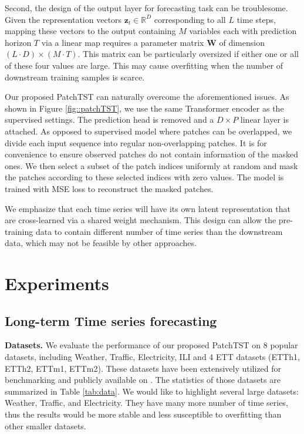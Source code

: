 \documentclass{article} \usepackage{iclr2023_conference,times}
\def\vz{{\bm{z}}}
\newcommand{\R}{\mathbb{R}}
\begin{document}
Second, the design of the output layer for forecasting task can be troublesome. Given the representation vectors  $\vz_t \in \R^D$ corresponding to all $L$ time steps, mapping these vectors to the output containing $M$ variables each with prediction horizon $T$ via a linear map requires a parameter matrix $\mathbf{W}$ of dimension $(L \cdot D) \times (M \cdot T)$. This matrix can be particularly oversized if either one or all of these four values are large. This may cause overfitting when the number of downstream training samples is scarce. 

Our proposed PatchTST can naturally overcome the aforementioned issues. As shown in Figure \ref{fig::patchTST}, we use the same Transformer encoder as the supervised settings. The prediction head is removed and a $D \times P$ linear layer is attached. As opposed to supervised model where patches can be overlapped, we divide each input sequence into regular non-overlapping patches. It is for convenience to ensure observed patches do not contain information of the masked ones. We then select a subset of the patch indices uniformly at random and mask the patches according to these selected indices with zero values. The model is trained with MSE loss to reconstruct the masked patches.

We emphasize that each time series will have its own latent representation that are cross-learned via a shared weight mechanism. This design can allow the pre-training data to contain different number of time series than the downstream data, which may not be feasible by other approaches. 


\section{Experiments}

\subsection{Long-term Time series forecasting}
\label{subsection::time series forecasting}

\textbf{Datasets.} We evaluate the performance of our proposed PatchTST on $8$ popular datasets, including Weather, Traffic, Electricity, ILI and 4 ETT datasets (ETTh1, ETTh2, ETTm1, ETTm2). These datasets have been extensively utilized for benchmarking and publicly available on \citep{autoformer}. The statistics of those datasets are summarized in Table \ref{tab:data}. We would like to highlight several large datasets: Weather, Traffic, and Electricity. They have many more number of time series, thus the results would be more stable and less susceptible to overfitting than other smaller datasets.
\end{document}
